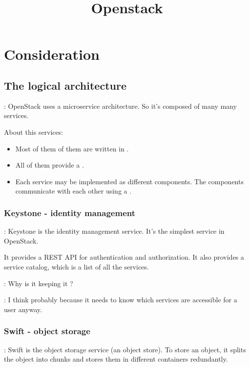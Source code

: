 \documentclass[dvipsnames]{article}
\title{Openstack}
\begin{document}
\maketitle

\section{Consideration}

\subsection{The logical architecture}

 : OpenStack uses a microservice architecture. So it's composed of
many many services. 

About this services:

\begin{itemize}
\item Most of them of them are written in .
\item All of them provide a .
\item Each service may be implemented as different components. The components
  communicate with each other using a .
\end{itemize}

\subsubsection{Keystone - identity management}

 : Keystone is the identity management service. It's the simplest
service in OpenStack.

It provides a REST API for authentication and authorization. It also provides a
service catalog, which is a list of all the services.

 : Why is it keeping it ?

 : I think probably because it needs to know which services are
accessible for a user anyway.

\subsubsection{Swift - object storage}

 : Swift is the object storage service (an object store). To store
an object, it splits the object into chunks and stores them in different
containers redundantly.
\end{document}
